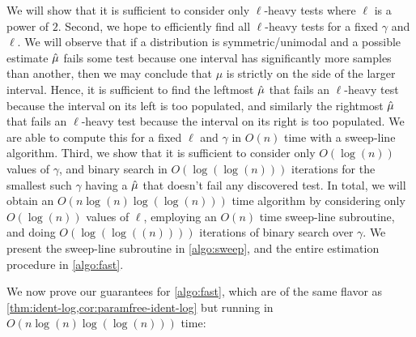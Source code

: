 We will show that it is sufficient to consider only $\ell$-heavy tests where $\ell$ is a power of $2$.
Second, we hope to efficiently find all $\ell$-heavy tests for a fixed $\gamma$ and $\ell$. We will observe that if a distribution is symmetric/unimodal and a possible estimate $\hat{\mu}$ fails some test because one interval has significantly more samples than another, then we may conclude that $\mu$ is strictly on the side of the larger interval. Hence, it is sufficient to find the leftmost $\hat{\mu}$ that fails an $\ell$-heavy test because the interval on its left is too populated, and similarly the rightmost $\hat{\mu}$ that fails an $\ell$-heavy test because the interval on its right is too populated. We are able to compute this for a fixed $\ell$ and $\gamma$ in $O(n)$ time with a sweep-line algorithm. Third, we show that it is sufficient to consider only $O(\log(n))$ values of $\gamma$, and binary search in $O(\log(\log(n)))$ iterations for the smallest such $\gamma$ having a $\hat{\mu}$ that doesn't fail any discovered test. In total, we will obtain an $O(n \log(n) \log(\log(n)))$ time algorithm by considering only $O(\log(n))$ values of $\ell$, employing an $O(n)$ time sweep-line subroutine, and doing $O(\log(\log((n))))$ iterations of binary search over $\gamma$. We present the sweep-line subroutine in \cref{algo:sweep}, and the entire estimation procedure in \cref{algo:fast}.



We now prove our guarantees for \cref{algo:fast}, which are of the same flavor as \cref{thm:ident-log,cor:paramfree-ident-log} but running in $O(n \log(n) \log(\log(n)))$ time:





